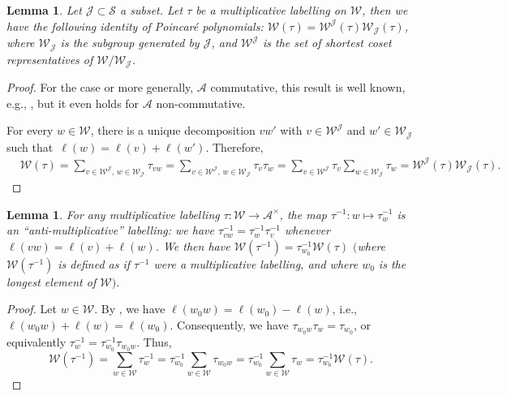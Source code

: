 \documentclass[10pt,a4paper]{amsart}
\newtheorem{Lemma}[Theorem]{Lemma}
\theoremstyle{definition}
\numberwithin{equation}{section}
\begin{document}
\begin{Lemma}\label{sec:lem-decompose-poincare}
 Let $\mathcal{J}\subset\mathcal{S}$ a subset. Let $\tau$ be a
 multiplicative labelling on $\mathcal{W}$, then we have the following identity of Poincar\'e polynomials:
$
 \mathcal{W}(\tau) = \mathcal{W}^{\mathcal{J}}(\tau) \mathcal{W}_{\mathcal{J}}(\tau)$,
 where $\mathcal{W}_{\mathcal{J}}$ is the subgroup generated by $\mathcal{J}$, and $\mathcal{W}^{\mathcal{J}}$ is the set of shortest coset representatives of $\mathcal{W}/\mathcal{W}_{\mathcal{J}}$.
\end{Lemma}
\begin{proof}
 For the case  or more generally, $\mathcal{A}$
 commutative, this result is well known, e.g., \cite[Section~5.12]{humphreysRefl}, but it even holds for $\mathcal{A}$ non-commutative.

 For every $w\in\mathcal{W}$, there is a unique decomposition $vw'$ with
 $v\in \mathcal{W}^{\mathcal{J}}$ and $w'\in \mathcal{W}_{\mathcal{J}}$ such that~${\ell(w)=\ell(v)+\ell(w')}$. Therefore,
 \begin{align*}
& \mathcal{W}(\tau)= \sum_{v\in \mathcal{W}^{\mathcal{J}},\, w\in \mathcal{W}_{\mathcal{J}}}
 \tau_{vw} = \sum_{v\in \mathcal{W}^{\mathcal{J}},\, w\in \mathcal{W}_{\mathcal{J}}}
 \tau_v \tau_w= \sum_{v\in \mathcal{W}^{\mathcal{J}}} \tau_v \sum_{w\in \mathcal{W}_{\mathcal{J}}} \tau_w
 = \mathcal{W}^{\mathcal{J}}(\tau) \mathcal{W}_{\mathcal{J}}(\tau).\tag*{\qed}
 \end{align*} \renewcommand{\qed}{}
\end{proof}

\begin{Lemma}\label{sec:lem-inverse-labelling}
 For any multiplicative labelling $\tau\colon \mathcal{W}\to \mathcal{A}^\times$, the map $\tau^{-1}\colon w\mapsto \tau_w^{-1}$ is an
``anti-multiplicative'' labelling: we have $\tau_{vw}^{-1} = \tau_w^{-1}\tau_v^{-1}$ whenever $\ell(vw)=\ell(v)+\ell(w)$.
 We then have
$
 \mathcal{W}(\tau^{-1}) = \tau_{w_0}^{-1} \mathcal{W}(\tau)
$
$($where $\mathcal{W}(\tau^{-1})$ is defined as if $\tau^{-1}$ were a multiplicative labelling,
 and where $w_0$ is the longest element of $\mathcal{W})$.
\end{Lemma}
\begin{proof}
 Let $w\in \mathcal{W}$. By \cite[Corollary~1.8]{humphreysRefl}, we have
 $\ell(w_0w)=\ell(w_0)-\ell(w)$, i.e., $\ell(w_0w)+\ell(w)=\ell(w_0)$.
 Consequently, we have $\tau_{w_0w}\tau_w=\tau_{w_0}$, or
 equivalently
 $\tau_w^{-1}=\tau_{w_0}^{-1}\tau_{w_0w}$.
 Thus,
 \[
 \mathcal{W}(\tau^{-1}) = \sum_{w\in\mathcal{W}} \tau_w^{-1}
 = \tau_{w_0}^{-1}\sum_{w\in\mathcal{W}} \tau_{w_0w}
 = \tau_{w_0}^{-1}\sum_{w\in\mathcal{W}} \tau_w
 = \tau_{w_0}^{-1} \mathcal{W}(\tau).\tag*{\qed}
 \]\renewcommand{\qed}{}
\end{proof}
\end{document}
